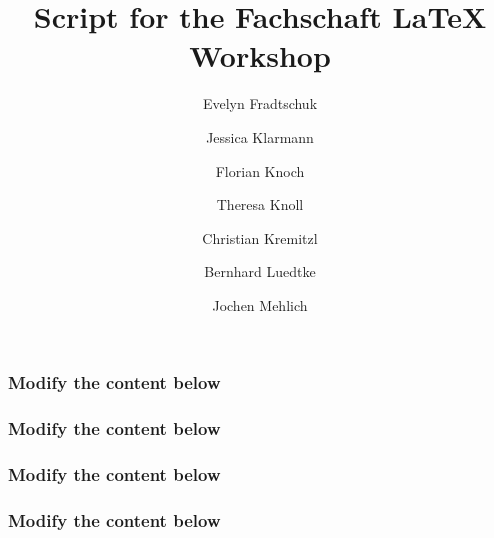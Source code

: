 
\title{Script for the Fachschaft  \LaTeX{} Workshop}
\author{Evelyn Fradtschuk \and Jessica Klarmann \and Florian Knoch \and Theresa Knoll \and Christian Kremitzl \and Bernhard Luedtke \and Jochen Mehlich}


\frenchspacing

\renewcommand{\thesection}{E\arabic{section}}
\renewcommand{\thesubsection}{\arabic{subsection}}


\thispagestyle{empty}
\newpage
\setcounter{page}{1} %
\setcounter{tocdepth}{2}
\tableofcontents
\newpage



\setcounter{section}{2}


\subsubsection*{Modify the content below}


\newpage

\subsubsection*{Modify the content below}


\newpage

\subsubsection*{Modify the content below}


\newpage

\subsubsection*{Modify the content below}


